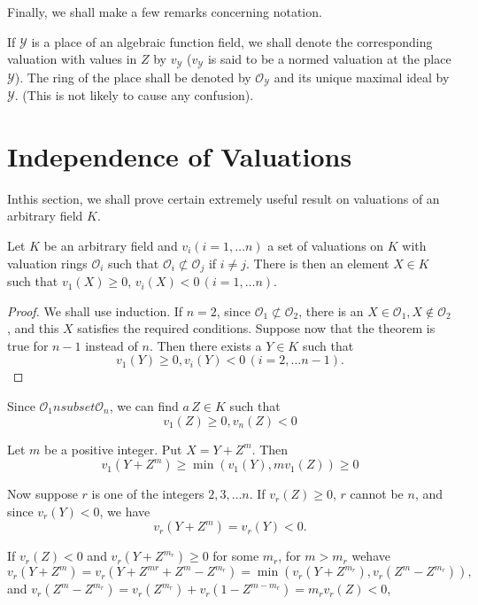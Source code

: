 Finally, we shall make a few remarks concerning notation.

If $\mathscr{Y}$ is a place of an algebraic function field, we shall
denote the corresponding valuation with values in $Z$ by
$v_\mathscr{Y}$ ($v_\mathscr{Y}$ is said to be a normed valuation at
the place $\mathscr{Y}$). The ring of the place shall be denoted by
$\mathscr{O}_\mathscr{Y}$ and its unique maximal ideal by
$\mathscr{Y}$. (This is not likely to cause any confusion). 

\section{Independence of Valuations}\label{chap4:sec8}%

In\pageoriginale this section, we shall prove certain extremely useful result on
valuations of an arbitrary field $K$. 


\begin{theorem*}
  Let $K$ be an arbitrary field and $v_i (i=1,\ldots n)$ a set of
  valuations on $K$ with valuation rings $\mathscr{O}_i$ such that
  $\mathscr{O}_i \nsubset  \mathscr{O}_j$ if $i
  \neq j$. There is then an element $X \in K$ such that $v_1 (X) \geq
  0$, $v_i (X) < 0\, (i=1,\ldots n)$. 
\end{theorem*}

\begin{proof}
  We shall use induction. If $n=2$, since $\mathscr{O}_1 
  \nsubset \mathscr{O}_2$, there is an $X \in \mathscr{O}_1,
  X \notin \mathscr{O}_2$, and this $X$ satisfies the required
  conditions. Suppose now that the theorem is true for $n-1$ instead
  of $n$. Then there exists a $Y \in K$ such that 
  $$
  v_1 (Y) \geq 0, v_i(Y) < 0 \,(i=2, \ldots n-1).
  $$
\end{proof}

Since $\mathscr{O}_1 nsubset \mathscr{O}_n$, we can
find $a\, Z \in K$ such that 
$$
v_1 (Z) \geq 0, v_n (Z) < 0
$$

Let $m$ be a positive integer. Put $X = Y + Z^m$. Then 
$$
v_1(Y + Z^m) \geq \min (v_1 (Y), mv_1 (Z)) \geq 0
$$

Now suppose $r$ is one of the integers $2, 3, \ldots n$. If $v_r (Z)
\geq 0$, $r$ cannot be $n$, and since $v_r(Y)< 0$, we have 
$$
v_r (Y+Z^m) = v_r (Y) < 0.
$$

If $v_r (Z) < 0$ and $v_r(Y + Z^{m_r}) \geq 0$ for some $m_r$, for $m
> m_r$ we\pageoriginale have  
$$
v_r(Y+Z^m) = v_r(Y+Z^{mr} + Z^m - Z^{m_r}) = \min (v_r (Y + Z^{m_r}),
v_r (Z^m - Z^{m_r})), 
$$
and $v_r (Z^m-Z^{m_r}) = v_r (Z^{m_r}) + v_r(1-Z^{m-m_r}) = m_r v_r
(Z) < 0$, 

